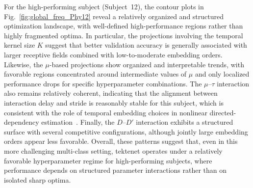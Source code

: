 {For the high-performing subject (Subject~12), the contour plots in Fig.~\ref{fig:global_freq_Phy12} reveal a relatively organized and structured optimization landscape, with well-defined high-performance regions rather than highly fragmented optima. In particular, the projections involving the temporal kernel size $K$ suggest that better validation accuracy is generally associated with larger receptive fields combined with low-to-moderate embedding orders. Likewise, the $\mu$-based projections show organized and interpretable trends, with favorable regions concentrated around intermediate values of $\mu$ and only localized performance drops for specific hyperparameter combinations. The $\mu$--$\tau$ interaction also remains relatively coherent, indicating that the alignment between interaction delay and stride is reasonably stable for this subject, which is consistent with the role of temporal embedding choices in nonlinear directed-dependency estimation~\cite{takens1981detecting, schreiber2000measuring}. Finally, the $D$--$D'$ interaction exhibits a structured surface with several competitive configurations, although jointly large embedding orders appear less favorable. Overall, these patterns suggest that, even in this more challenging multi-class setting, \gls{tektenet} operates under a relatively favorable hyperparameter regime for high-performing subjects, where performance depends on structured parameter interactions rather than on isolated sharp optima.}

